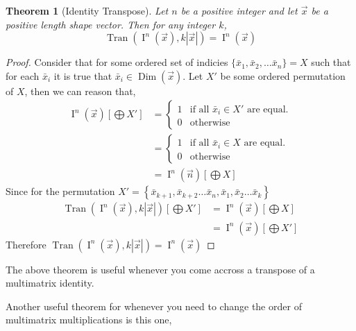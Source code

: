 \documentclass[12pt]{book}
\theoremstyle{plain}
\newtheorem{theorem}{Theorem}[chapter]
\theoremstyle{definition}
\theoremstyle{ppart}
\theoremstyle{case}
\theoremstyle{solution}
\DeclareMathOperator{\Dim}{Dim}
\DeclareMathOperator{\Ident}{I}
\DeclareMathOperator{\Tran}{Tran}
\newcommand{\shape}[1]{\left|#1\right|}
\begin{document}
\begin{theorem}[Identity Transpose]
Let $n$ be a positive integer and let $\vec{x}$ be a positive length
shape vector. Then for any integer $k$,
\[ \Tran(\Ident^n(\vec{x}), k\shape{\vec{x}}) = \Ident^n(\vec{x}) \]
\end{theorem}
\begin{proof}
Consider that for some ordered set of indicies
$\{\bar{x}_1, \bar{x}_2, \ldots \bar{x}_n\} = X$ such that for each
$\bar{x}_i$ it is true that $\bar{x}_i \in \Dim(\vec{x})$.
Let $X'$ be some ordered permutation of $X$, then we can reason that,
\begin{align*}
 \Ident^n(\vec{x})\left[\bigoplus X'\right]
 &= 
	\left\{
  \begin{array}{ll}
    1 & \mbox{if all } \bar{x}_i \in X' \mbox{ are equal.}\\
    0 & \mbox{otherwise}
  \end{array}
	\right.\\
 &= 
	\left\{
  \begin{array}{ll}
    1 & \mbox{if all } \bar{x}_i \in X \mbox{ are equal.}\\
    0 & \mbox{otherwise}
  \end{array}
	\right.\\
 &=\Ident^n(\vec{n})\left[\bigoplus X\right]
\end{align*}
Since for the permutation
$X' = \left\{\bar{x}_{k+1}, \bar{x}_{k+2} \ldots \bar{x}_{n},
\bar{x}_1, \bar{x}_2 \ldots \bar{x}_k\right\}$
\begin{align*}
  \Tran(\Ident^n(\vec{x}), k\shape{\vec{x}})\left[\bigoplus X'\right]
	&=
  \Ident^n(\vec{x})\left[\bigoplus X\right]\\
	&=
  \Ident^n(\vec{x})\left[\bigoplus X'\right]
\end{align*}
Therefore
$\Tran(\Ident^n(\vec{x}), k\shape{\vec{x}}) = \Ident^n(\vec{x})$
\end{proof}

The above theorem is useful whenever you come accross a transpose of a
multimatrix identity.

Another useful theorem for whenever you need to change the order of
multimatrix multiplications is this one,
\end{document}
